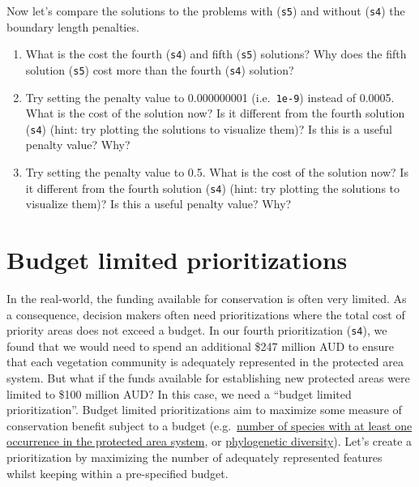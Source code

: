 \documentclass[
  12pt,
]{book}
\makeatletter
\providecommand{\tightlist}{%
  \setlength{\itemsep}{0pt}\setlength{\parskip}{0pt}}
\newenvironment{kframe}{%
\medskip{}
\setlength{\fboxsep}{.8em}
 \def\at@end@of@kframe{}%
 \ifinner\ifhmode%
  \def\at@end@of@kframe{\end{minipage}}%
  \begin{minipage}{\columnwidth}%
 \fi\fi%
 \def\FrameCommand##1{\hskip\@totalleftmargin \hskip-\fboxsep
 \colorbox{shadecolor}{##1}\hskip-\fboxsep
     \hskip-\linewidth \hskip-\@totalleftmargin \hskip\columnwidth}%
 \MakeFramed {\advance\hsize-\width
   \@totalleftmargin\z@ \linewidth\hsize
   \@setminipage}}%
 {\par\unskip\endMakeFramed%
 \at@end@of@kframe}
\newenvironment{rmdblock}[1]
  {
  \begin{itemize}
  \renewcommand{\labelitemi}{
    \raisebox{-.7\height}[0pt][0pt]{
      {\setkeys{Gin}{width=3em,keepaspectratio}\texttt{[image: images/\#1]}}
    }
  }
  \setlength{\fboxsep}{1em}
  \begin{kframe}
  \item
  }
  {
  \end{kframe}
  \end{itemize}
  }
\newenvironment{rmdquestion}
  {\begin{rmdblock}{question}}
  {\end{rmdblock}}
\makeatother
\begin{document}
Now let's compare the solutions to the problems with (\texttt{s5}) and without (\texttt{s4}) the boundary length penalties.

\begin{rmdquestion}
\begin{enumerate}
\def\labelenumi{\arabic{enumi}.}
\tightlist
\item
  What is the cost the fourth (\texttt{s4}) and fifth (\texttt{s5}) solutions? Why does the fifth solution (\texttt{s5}) cost more than the fourth (\texttt{s4}) solution?
\item
  Try setting the penalty value to 0.000000001 (i.e.~\texttt{1e-9}) instead of 0.0005. What is the cost of the solution now? Is it different from the fourth solution (\texttt{s4}) (hint: try plotting the solutions to visualize them)? Is this is a useful penalty value? Why?
\item
  Try setting the penalty value to 0.5. What is the cost of the solution now? Is it different from the fourth solution (\texttt{s4}) (hint: try plotting the solutions to visualize them)? Is this a useful penalty value? Why?
\end{enumerate}
\end{rmdquestion}

\clearpage

\hypertarget{budget-limited-prioritizations}{%
\section{Budget limited prioritizations}\label{budget-limited-prioritizations}}

In the real-world, the funding available for conservation is often very limited. As a consequence, decision makers often need prioritizations where the total cost of priority areas does not exceed a budget. In our fourth prioritization (\texttt{s4}), we found that we would need to spend an additional \$247 million AUD to ensure that each vegetation community is adequately represented in the protected area system. But what if the funds available for establishing new protected areas were limited to \$100 million AUD? In this case, we need a ``budget limited prioritization''. Budget limited prioritizations aim to maximize some measure of conservation benefit subject to a budget (e.g.~\href{https://prioritizr.net/reference/add_max_cover_objective.html}{number of species with at least one occurrence in the protected area system}, or \href{https://prioritizr.net/reference/add_max_phylo_div_objective.html}{phylogenetic diversity}). Let's create a prioritization by maximizing the number of adequately represented features whilst keeping within a pre-specified budget.
\end{document}

